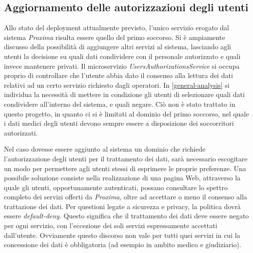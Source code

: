\documentclass[a4paper,12pt]{report}
\begin{document}
\subsection{Aggiornamento delle autorizzazioni degli utenti}
Allo stato del deployment attualmente previsto, l'unico servizio erogato dal sistema \emph{Proxima} risulta essere quello del primo soccorso. Si è ampiamente discusso della possibilità di aggiungere altri servizi al sistema, lasciando agli utenti la decisione su quali dati condividere con il personale autorizzato e quali invece mantenere privati. Il microservizio \emph{UsersAuthorizationsService} si occupa proprio di controllare che l'utente abbia dato il consenso alla lettura dei dati relativi ad un certo servizio richiesto dagli operatori. In \autoref{general-analysis} si individua la necessità di mettere in condizione gli utenti di selezionare quali dati condividere all'interno del sistema, e quali negare. Ciò non è stato trattato in questo progetto, in quanto ci si è limitati al dominio del primo soccorso, nel quale i dati medici degli utenti devono sempre essere a disposizione dei soccorritori autorizzati.

Nel caso dovesse essere aggiunto al sistema un dominio che richiede l'autorizzazione degli utenti per il trattamento dei dati, sarà necessario escogitare un modo per permettere agli utenti stessi di esprimere le proprie preferenze. Una possibile soluzione consiste nella realizzazione di una pagina Web, attraverso la quale gli utenti, opportunamente autenticati, possano consultare lo spettro completo dei servizi offerti da \emph{Proxima}, oltre ad accettare o meno il consenso alla trattazione dei dati. Per questioni legate a sicurezza e privacy, la politica dovrà essere \emph{default-deny}. Questo significa che il trattamento dei dati deve essere negato per ogni servizio, con l'eccezione dei soli servizi espressamente accettati dall'utente. Ovviamente questo discorso non vale per tutti quei servizi in cui la concessione dei dati è obbligatoria (ad esempio in ambito medico e giudiziario).
\end{document}

